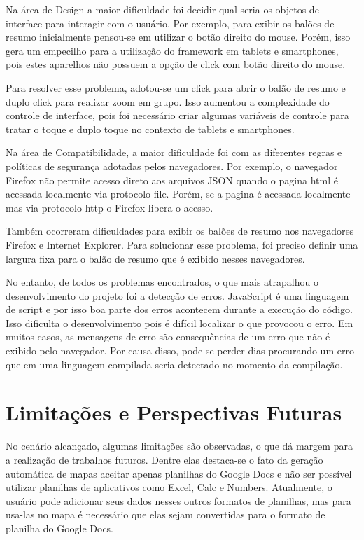 Na área de Design a maior dificuldade foi decidir qual seria os objetos de interface para interagir com o usuário. Por exemplo, para exibir os balões de resumo inicialmente pensou-se em utilizar o botão direito do mouse. Porém, isso gera um empecilho para a utilização do framework em tablets e smartphones, pois estes aparelhos não possuem a opção de click com botão direito do mouse. 

Para resolver esse problema, adotou-se um click para abrir o balão de resumo e duplo click para realizar zoom em grupo. Isso aumentou a complexidade do controle de interface, pois foi necessário criar algumas variáveis de controle para tratar o toque e duplo toque no contexto de tablets e smartphones.

Na área de Compatibilidade, a maior dificuldade foi com as diferentes regras e políticas de segurança adotadas pelos navegadores. Por exemplo, o navegador Firefox não permite acesso direto aos arquivos JSON quando o pagina html é acessada localmente via protocolo file. Porém, se a pagina é acessada localmente mas via protocolo http o Firefox libera o acesso. 

Também ocorreram dificuldades para exibir os balões de resumo nos navegadores Firefox e Internet Explorer. Para solucionar esse problema, foi preciso definir uma largura fixa para o balão de resumo que é exibido nesses navegadores.
 
No entanto, de todos os problemas encontrados, o que mais atrapalhou o desenvolvimento do projeto foi a detecção de erros. JavaScript é uma linguagem de script  e por isso boa parte dos erros acontecem durante a execução do código. Isso dificulta o desenvolvimento pois é difícil localizar o que provocou o erro. Em muitos casos, as mensagens de erro são consequências de um erro que não é exibido pelo navegador. Por causa disso, pode-se perder dias procurando um erro que em uma linguagem compilada seria detectado no momento da compilação.


\section{Limitações e Perspectivas Futuras}


No cenário alcançado, algumas limitações são observadas, o que dá margem para a realização de trabalhos futuros. Dentre elas destaca-se o fato da geração automática de mapas aceitar apenas planilhas do Google Docs e não ser possível utilizar planilhas de aplicativos como Excel, Calc e Numbers. Atualmente, o usuário pode adicionar seus dados nesses outros formatos de planilhas, mas para usa-las no mapa  é necessário que elas sejam convertidas para  o formato de planilha do Google Docs.

